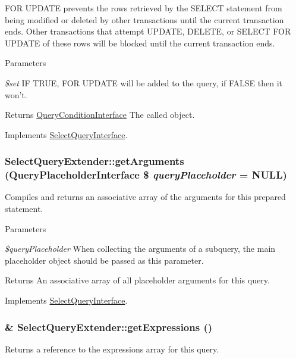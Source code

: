 FOR UPDATE prevents the rows retrieved by the SELECT statement from being modified or deleted by other transactions until the current transaction ends. Other transactions that attempt UPDATE, DELETE, or SELECT FOR UPDATE of these rows will be blocked until the current transaction ends.


\begin{DoxyParams}{Parameters}
\item[{\em \$set}]IF TRUE, FOR UPDATE will be added to the query, if FALSE then it won't.\end{DoxyParams}
\begin{DoxyReturn}{Returns}
\hyperlink{interfaceQueryConditionInterface}{QueryConditionInterface} The called object. 
\end{DoxyReturn}


Implements \hyperlink{interfaceSelectQueryInterface_a723663b3105f06f28c75bd9d16b7a3c7}{SelectQueryInterface}.\hypertarget{classSelectQueryExtender_a698c3d294496989368d02e5084c27f7e}{
\subsubsection[{getArguments}]{\setlength{\rightskip}{0pt plus 5cm}SelectQueryExtender::getArguments ({\bf QueryPlaceholderInterface} \$ {\em queryPlaceholder} = {\ttfamily NULL})}}
\label{classSelectQueryExtender_a698c3d294496989368d02e5084c27f7e}
Compiles and returns an associative array of the arguments for this prepared statement.


\begin{DoxyParams}{Parameters}
\item[{\em \$queryPlaceholder}]When collecting the arguments of a subquery, the main placeholder object should be passed as this parameter.\end{DoxyParams}
\begin{DoxyReturn}{Returns}
An associative array of all placeholder arguments for this query. 
\end{DoxyReturn}


Implements \hyperlink{interfaceSelectQueryInterface_ae033466efee1ce7d14b64f1d6b23e4a2}{SelectQueryInterface}.\hypertarget{classSelectQueryExtender_af3a9304421ec40196ce0d3df91accdb4}{
\subsubsection[{getExpressions}]{\setlength{\rightskip}{0pt plus 5cm}\& SelectQueryExtender::getExpressions ()}}
\label{classSelectQueryExtender_af3a9304421ec40196ce0d3df91accdb4}
Returns a reference to the expressions array for this query.

